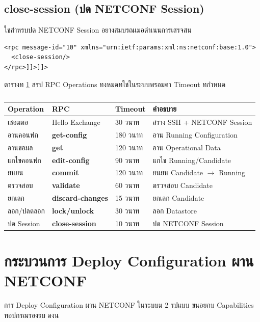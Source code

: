 \subsection{close-session (ปด NETCONF Session)}
\hspace*{1.3em}
ใชสำหรบปด NETCONF Session อยางสมบรณเมอดำเนนการเสรจสน

{\fontsize{13}{14}\selectfont
\begin{verbatim}
<rpc message-id="10" xmlns="urn:ietf:params:xml:ns:netconf:base:1.0">
  <close-session/>
</rpc>]]>]]>
\end{verbatim}
}

\hspace*{1.3em}
ตารางท \ref{tabD:RpcOperations} สรป RPC Operations ทงหมดทใชในระบบพรอมคา Timeout ทกำหนด

\begin{table}[H]
\centering
\caption{}
\label{tabD:RpcOperations}
\begin{tabularx}{\textwidth}{|l|l|l|X|}
\hline
\textbf{Operation} & \textbf{RPC} & \textbf{Timeout} & \textbf{คำอธบาย} \\
\hline
เชอมตอ & Hello Exchange & 30 วนาท & สราง SSH + NETCONF Session \\
\hline
อานคอนฟก & \textbf{get-config} & 180 วนาท & อาน Running Configuration \\
\hline
อานขอมล & \textbf{get} & 120 วนาท & อาน Operational Data \\
\hline
แกไขคอนฟก & \textbf{edit-config} & 90 วนาท & แกไข Running/Candidate \\
\hline
ยนยน & \textbf{commit} & 120 วนาท & ยนยน Candidate $\rightarrow$ Running \\
\hline
ตรวจสอบ & \textbf{validate} & 60 วนาท & ตรวจสอบ Candidate \\
\hline
ยกเลก & \textbf{discard-changes} & 15 วนาท & ยกเลก Candidate \\
\hline
ลอก/ปลดลอก & \textbf{lock/unlock} & 30 วนาท & ลอก Datastore \\
\hline
ปด Session & \textbf{close-session} & 10 วนาท & ปด NETCONF Session \\
\hline
\end{tabularx}
\end{table}

\section{กระบวนการ Deploy Configuration ผาน NETCONF}
\hspace*{1.3em}
การ Deploy Configuration ผาน NETCONF ในระบบม 2 รปแบบ ขนอยกบ Capabilities ทอปกรณรองรบ ดงน

